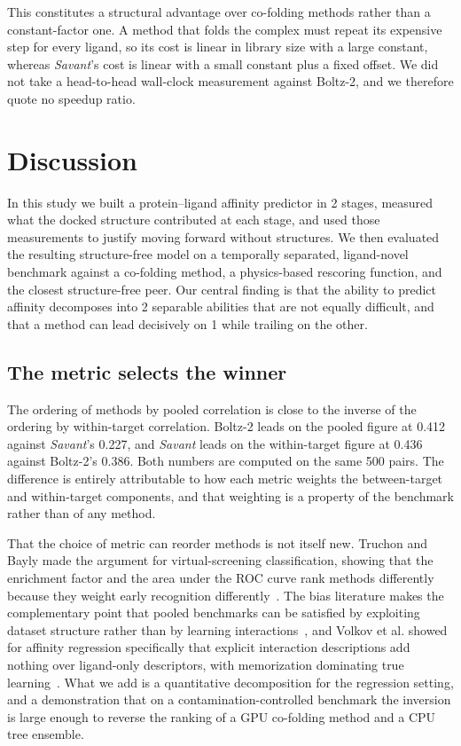 \documentclass[times, twoside]{zHenriquesLab-StyleBioRxiv}
\newcommand{\savant}{\textit{Savant}\xspace}
\newcommand{\pl}{protein--ligand\xspace}
\begin{document}
This constitutes a structural advantage over co-folding methods rather than a constant-factor one. A method that folds the complex must repeat its expensive step for every ligand, so its cost is linear in library size with a large constant, whereas \savant's cost is linear with a small constant plus a fixed offset. We did not take a head-to-head wall-clock measurement against Boltz-2, and we therefore quote no speedup ratio.

\section*{Discussion}

In this study we built a \pl affinity predictor in 2 stages, measured what the docked structure contributed at each stage, and used those measurements to justify moving forward without structures. We then evaluated the resulting structure-free model on a temporally separated, ligand-novel benchmark against a co-folding method, a physics-based rescoring function, and the closest structure-free peer. Our central finding is that the ability to predict affinity decomposes into 2 separable abilities that are not equally difficult, and that a method can lead decisively on 1 while trailing on the other.

\subsection*{The metric selects the winner}

The ordering of methods by pooled correlation is close to the inverse of the ordering by within-target correlation. Boltz-2 leads on the pooled figure at 0.412 against \savant's 0.227, and \savant leads on the within-target figure at 0.436 against Boltz-2's 0.386. Both numbers are computed on the same 500 pairs. The difference is entirely attributable to how each metric weights the between-target and within-target components, and that weighting is a property of the benchmark rather than of any method.

That the choice of metric can reorder methods is not itself new. Truchon and Bayly made the argument for virtual-screening classification, showing that the enrichment factor and the area under the ROC curve rank methods differently because they weight early recognition differently~\cite{truchon2007bedroc}. The bias literature makes the complementary point that pooled benchmarks can be satisfied by exploiting dataset structure rather than by learning interactions~\cite{chen2019dude,wallach2018memorization,sieg2019bias}, and Volkov et al. showed for affinity regression specifically that explicit interaction descriptions add nothing over ligand-only descriptors, with memorization dominating true learning~\cite{volkov2022frustration}. What we add is a quantitative decomposition for the regression setting, and a demonstration that on a contamination-controlled benchmark the inversion is large enough to reverse the ranking of a GPU co-folding method and a CPU tree ensemble.
\end{document}
